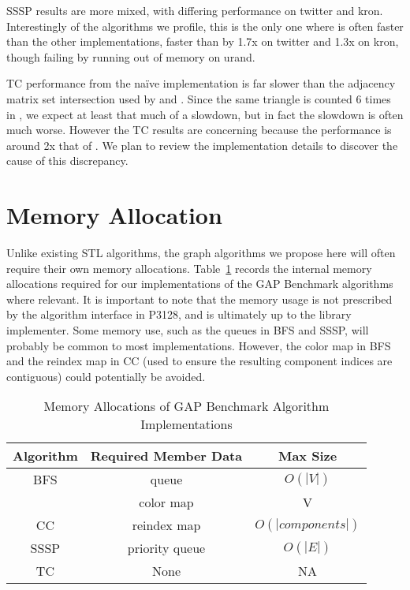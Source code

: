 SSSP results are more mixed, with differing performance on twitter and kron.
Interestingly of the algorithms we profile, this is the only one where
\bgl is often faster than the other implementations,
faster than \stdgraph by 1.7x on twitter and 1.3x on kron, though
failing by running out of memory on urand.

TC performance from the na\"ive \bgl implementation
is far slower than the adjacency matrix set intersection used by \nwgraph
and \stdgraph.
Since the same triangle is counted 6 times in \bgl,
we expect at least that much of a slowdown, but in fact the slowdown
is often much worse.
However the TC results are concerning because the \stdgraph
performance is around 2x that of \nwgraph.
We plan to review the implementation details to discover the cause of
this discrepancy.

\section{Memory Allocation}
Unlike existing STL algorithms, the graph algorithms we propose here
will often require their own memory allocations.
Table~\ref{tab:internalmem} records the internal memory allocations
required for our implementations of the GAP Benchmark algorithms
where relevant.
It is important to note that the memory usage is not prescribed
by the algorithm interface in P3128, and is ultimately up to the
library implementer.
Some memory use, such as the queues in BFS and SSSP, will
probably be common to most implementations.
However, the color map in BFS and the reindex map in CC
(used to ensure the resulting component indices are contiguous)
could potentially be avoided.

\begin{table}[h!]
\centering
\begin{tabular}{| c | c | c |}
\hline
Algorithm & Required Member Data & Max Size \\\hline
BFS  & queue          & $O(|V|)$ \\
     & color map      & V \\\hline
CC   & reindex map    & $O(|components|)$ \\\hline
SSSP & priority queue & $O(|E|)$\\\hline
TC   & None          & N\/A\\
\hline
\end{tabular}
\caption{Memory Allocations of GAP Benchmark Algorithm Implementations}
\label{tab:internalmem}
\end{table}
